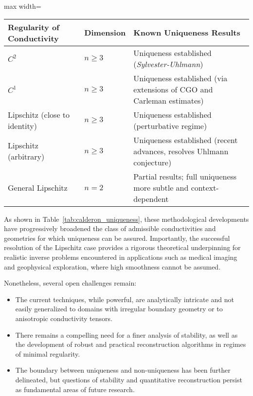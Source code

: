 \documentclass[sigconf]{acmart}
\begin{document}
\begin{table*}[htbp]
\centering
\caption{Summary of uniqueness results for Calderón's problem under varying conductivity regularity and spatial dimension.}
\label{tab:calderon_uniqueness}
\begin{adjustbox}{max width=\textwidth}
\begin{tabular}{lll}
\toprule
\textbf{Regularity of Conductivity} & \textbf{Dimension} & \textbf{Known Uniqueness Results} \\
\midrule
$C^2$ & $n \geq 3$ & Uniqueness established (\textit{Sylvester-Uhlmann}) \\
$C^1$ & $n \geq 3$ & Uniqueness established (via extensions of CGO and Carleman estimates) \\
Lipschitz (close to identity) & $n \geq 3$ & Uniqueness established (perturbative regime) \\
Lipschitz (arbitrary) & $n \geq 3$ & Uniqueness established (recent advances, resolves Uhlmann conjecture) \\
General Lipschitz & $n = 2$ & Partial results; full uniqueness more subtle and context-dependent \\
\bottomrule
\end{tabular}
\end{adjustbox}
\end{table*}

As shown in Table~\ref{tab:calderon_uniqueness}, these methodological developments have progressively broadened the class of admissible conductivities and geometries for which uniqueness can be assured. Importantly, the successful resolution of the Lipschitz case provides a rigorous theoretical underpinning for realistic inverse problems encountered in applications such as medical imaging and geophysical exploration, where high smoothness cannot be assumed.

Nonetheless, several open challenges remain:

\begin{itemize}
    \item The current techniques, while powerful, are analytically intricate and not easily generalized to domains with irregular boundary geometry or to anisotropic conductivity tensors.
    \item There remains a compelling need for a finer analysis of stability, as well as the development of robust and practical reconstruction algorithms in regimes of minimal regularity.
    \item The boundary between uniqueness and non-uniqueness has been further delineated, but questions of stability and quantitative reconstruction persist as fundamental areas of future research.
\end{itemize}
\end{document}
